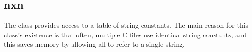 %
%
%
%
%

\subsection{nxn}
\label{nxn}

The  class provides access to a table of string constants.  The
main reason for this class's existence is that often, multiple C files use
identical string constants, and this saves memory by allowing all to refer to a
single string.

